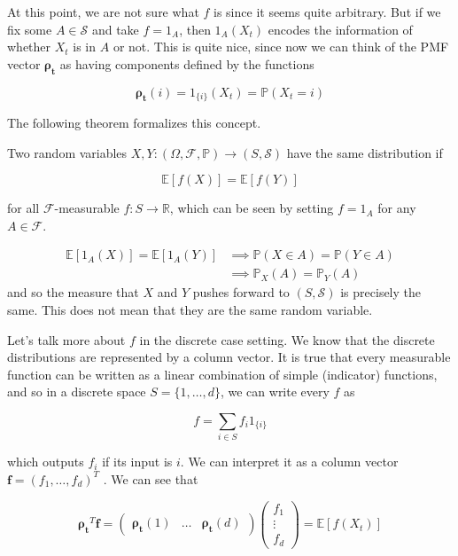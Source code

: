 \documentclass{article}
\begin{document}
    At this point, we are not sure what $f$ is since it seems quite arbitrary. But if we fix some $A \in \mathcal{S}$ and take $f = 1_A$, then $1_A (X_t)$ encodes the information of whether $X_t$ is in $A$ or not. This is quite nice, since now we can think of the PMF vector $\boldsymbol{\rho_t}$ as having components defined by the functions 

      \[\boldsymbol{\rho_t} (i) = 1_{\{i\}} (X_t) = \mathbb{P}(X_t = i)\]

    The following theorem formalizes this concept. 

    \begin{theorem}
      Two random variables $X, Y : (\Omega, \mathcal{F}, \mathbb{P}) \rightarrow (S, \mathcal{S})$ have the same distribution if 

        \[\mathbb{E}[f(X)] = \mathbb{E}[f(Y)]\]

      for all $\mathcal{F}$-measurable $f: S \rightarrow \mathbb{R}$, which can be seen by setting $f = 1_A$ for any $A \in \mathcal{F}$. 

      \begin{align*}
        \mathbb{E}[1_A (X)] = \mathbb{E}[1_A (Y)] & \implies \mathbb{P}(X \in A) = \mathbb{P}(Y \in A) \\
        & \implies \mathbb{P}_X (A) = \mathbb{P}_Y (A)
      \end{align*}
      and so the measure that $X$ and $Y$ pushes forward to $(S, \mathcal{S})$ is precisely the same. This does not mean that they are the same random variable. 
    \end{theorem}

    Let's talk more about $f$ in the discrete case setting. We know that the discrete distributions are represented by a column vector. It is true that every measurable function can be written as a linear combination of simple (indicator) functions, and so in a discrete space $S = \{1, \ldots, d\}$, we can write every $f$ as 

      \[f = \sum_{i \in S} f_i 1_{\{i\}} \]

    which outputs $f_i$ if its input is $i$. We can interpret it as a column vector $\mathbf{f} = (f_1, \ldots, f_d)^T$ . We can see that 

      \[\boldsymbol{\rho_t}^T \mathbf{f} = \begin{pmatrix} \boldsymbol{\rho_t} (1) & \ldots & \boldsymbol{\rho_t} (d) \end{pmatrix} \begin{pmatrix} f_1 \\ \vdots \\ f_d \end{pmatrix} = \mathbb{E}[f(X_t)]\]
\end{document}
